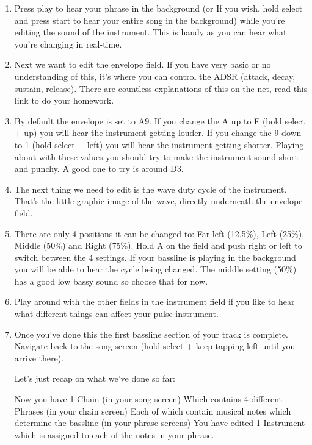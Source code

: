 \documentclass[]{article}
\begin{document}
\begin{enumerate}
\item Press play to hear your phrase in the background (or If you wish, hold select and press start to hear your entire song in the background) while you’re editing the sound of the instrument. This is handy as you can hear what you’re changing in real-time.

\item Next we want to edit the envelope field. If you have very basic or no understanding of this, it’s where you can control the ADSR (attack, decay, sustain, release). There are countless explanations of this on the net, read this link to do your homework.

\item By default the envelope is set to A9. If you change the A up to F (hold select + up) you will hear the instrument getting louder. If you change the 9 down to 1 (hold select + left) you will hear the instrument getting shorter. Playing about with these values you should try to make the instrument sound short and punchy. A good one to try is around D3.

\item The next thing we need to edit is the wave duty cycle of the instrument. That’s the little graphic image of the wave, directly underneath the envelope field.

\item There are only 4 positions it can be changed to: Far left (12.5\%), Left (25\%), Middle (50\%) and Right (75\%). Hold A on the field and push right or left to switch between the 4 settings. If your bassline is playing in the background you will be able to hear the cycle being changed. The middle setting (50\%) has a good low bassy sound so choose that for now.

\item Play around with the other fields in the instrument field if you like to hear what different things can affect your pulse instrument.

\item Once you’ve done this the first bassline section of your track is complete. Navigate back to the song screen (hold select + keep tapping left until you arrive there).

Let’s just recap on what we’ve done so far:

Now you have 1 Chain (in your song screen) Which contains 4 different Phrases (in your chain screen) Each of which contain musical notes which determine the bassline (in your phrase screens) You have edited 1 Instrument which is assigned to each of the notes in your phrase.


\end{enumerate}
\end{document}
